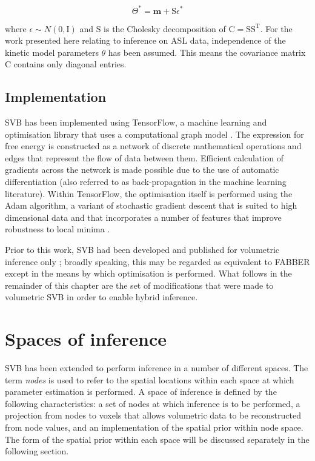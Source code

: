\documentclass[12pt]{report}
\newcommand{\mat}[1]{\mathrm{#1}}
\renewcommand{\vec}[1]{\mathbf{#1}}
\begin{document}
\begin{equation}
\Theta^* = \vec{m} + \mat{S}\epsilon^* 
\end{equation}

where $\epsilon \sim N(0,\mat{I})$ and S is the Cholesky decomposition of $\mat{C} = \mat{SS^T}$. For the work presented here relating to inference on ASL data, independence of the kinetic model parameters $\theta$ has been assumed. This means the covariance matrix $\mat{C}$ contains only diagonal entries. 

\subsection{Implementation}

SVB has been implemented using TensorFlow, a machine learning and optimisation library that uses a computational graph model \cite{abadi2016}. The expression for free energy is constructed as a network of discrete mathematical operations and edges that represent the flow of data between them. Efficient calculation of gradients across the network is made possible due to the use of automatic differentiation (also referred to as back-propagation in the machine learning literature). Within TensorFlow, the optimisation itself is performed using the Adam algorithm, a variant of stochastic gradient descent that is suited to high dimensional data and that incorporates a number of features that improve robustness to local minima \cite{Bottou2010, adam_optimisation}. 

Prior to this work, SVB had been developed and published for volumetric inference only \cite{chappellSVB, chappell2020fmrib}; broadly speaking, this may be regarded as equivalent to FABBER except in the means by which optimisation is performed. What follows in the remainder of this chapter are the set of modifications that were made to volumetric SVB in order to enable hybrid inference. 

\section{Spaces of inference}

SVB has been extended to perform inference in a number of different spaces. The term \textit{nodes} is used to refer to the spatial locations within each space at which parameter estimation is performed. A space of inference is defined by the following characteristics: a set of nodes at which inference is to be performed, a projection from nodes to voxels that allows volumetric data to be reconstructed from node values, and an implementation of the spatial prior within node space. The form of the spatial prior within each space will be discussed separately in the following section. 
\end{document}
